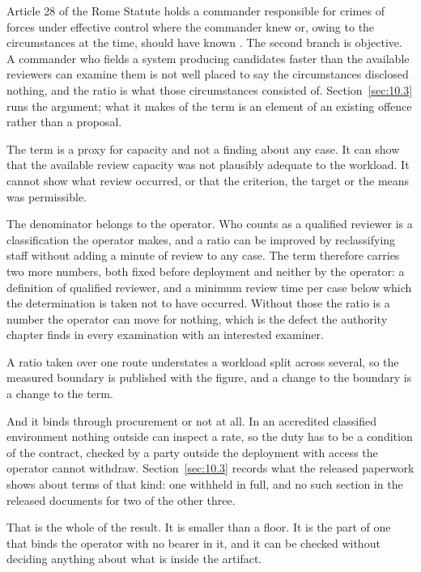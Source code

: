 Article 28 of the Rome Statute holds a commander responsible for crimes of forces under effective control where the commander knew or, owing to the circumstances at the time, should have known \autocite{icc1998rome}. The second branch is objective. A commander who fields a system producing candidates faster than the available reviewers can examine them is not well placed to say the circumstances disclosed nothing, and the ratio is what those circumstances consisted of. Section~\ref{sec:10.3} runs the argument; what it makes of the term is an element of an existing offence rather than a proposal.

The term is a proxy for capacity and not a finding about any case. It can show that the available review capacity was not plausibly adequate to the workload. It cannot show what review occurred, or that the criterion, the target or the means was permissible.

The denominator belongs to the operator. Who counts as a qualified reviewer is a classification the operator makes, and a ratio can be improved by reclassifying staff without adding a minute of review to any case. The term therefore carries two more numbers, both fixed before deployment and neither by the operator: a definition of qualified reviewer, and a minimum review time per case below which the determination is taken not to have occurred. Without those the ratio is a number the operator can move for nothing, which is the defect the authority chapter finds in every examination with an interested examiner.

A ratio taken over one route understates a workload split across several, so the measured boundary is published with the figure, and a change to the boundary is a change to the term.

And it binds through procurement or not at all. In an accredited classified environment nothing outside can inspect a rate, so the duty has to be a condition of the contract, checked by a party outside the deployment with access the operator cannot withdraw. Section~\ref{sec:10.3} records what the released paperwork shows about terms of that kind: one withheld in full, and no such section in the released documents for two of the other three.

That is the whole of the result. It is smaller than a floor. It is the part of one that binds the operator with no bearer in it, and it can be checked without deciding anything about what is inside the artifact.
